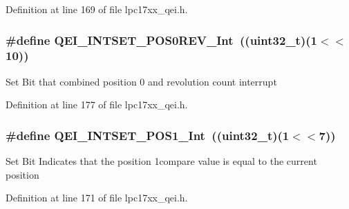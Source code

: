 \-Definition at line 169 of file lpc17xx\-\_\-qei.\-h.

\hypertarget{group___q_e_i___private___macros_ga04b93c9adc20e885fd40aaade23c97d2}{
\subsubsection[{\-Q\-E\-I\-\_\-\-I\-N\-T\-S\-E\-T\-\_\-\-P\-O\-S0\-R\-E\-V\-\_\-\-Int}]{\setlength{\rightskip}{0pt plus 5cm}\#define {\bf \-Q\-E\-I\-\_\-\-I\-N\-T\-S\-E\-T\-\_\-\-P\-O\-S0\-R\-E\-V\-\_\-\-Int}~((uint32\-\_\-t)(1$<$$<$10))}}\label{group___q_e_i___private___macros_ga04b93c9adc20e885fd40aaade23c97d2}
\-Set \-Bit that combined position 0 and revolution count interrupt 

\-Definition at line 177 of file lpc17xx\-\_\-qei.\-h.

\hypertarget{group___q_e_i___private___macros_ga3ac428cd84ab282183985b857dcefdfb}{
\subsubsection[{\-Q\-E\-I\-\_\-\-I\-N\-T\-S\-E\-T\-\_\-\-P\-O\-S1\-\_\-\-Int}]{\setlength{\rightskip}{0pt plus 5cm}\#define {\bf \-Q\-E\-I\-\_\-\-I\-N\-T\-S\-E\-T\-\_\-\-P\-O\-S1\-\_\-\-Int}~((uint32\-\_\-t)(1$<$$<$7))}}\label{group___q_e_i___private___macros_ga3ac428cd84ab282183985b857dcefdfb}
\-Set \-Bit \-Indicates that the position 1compare value is equal to the current position 

\-Definition at line 171 of file lpc17xx\-\_\-qei.\-h.

